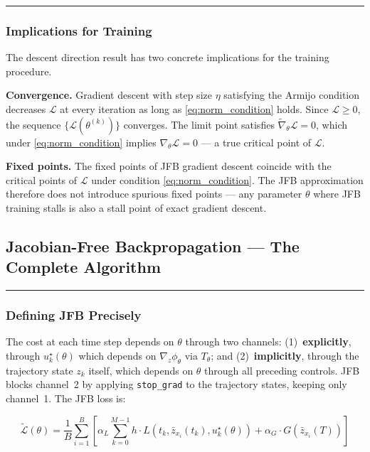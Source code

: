\documentclass{article}
\begin{document}
\medskip\hrule\medskip

\subsubsection{Implications for Training}

\begin{mathrequirementsbox}
The descent direction result has two concrete implications for the training
procedure.

\textbf{Convergence.} Gradient descent with step size $\eta$ satisfying the
Armijo condition decreases $\mathcal{L}$ at every iteration as long as
\eqref{eq:norm_condition} holds. Since $\mathcal{L} \geq 0$, the sequence
$\{\mathcal{L}(\theta^{(k)})\}$ converges. The limit point satisfies
$\widetilde{\nabla}_\theta\mathcal{L} = 0$, which under
\eqref{eq:norm_condition} implies $\nabla_\theta\mathcal{L} = 0$ --- a true
critical point of $\mathcal{L}$.

\textbf{Fixed points.} The fixed points of JFB gradient descent coincide
with the critical points of $\mathcal{L}$ under condition
\eqref{eq:norm_condition}. The JFB approximation therefore does not
introduce spurious fixed points --- any parameter $\theta$ where JFB
training stalls is also a stall point of exact gradient descent.
\end{mathrequirementsbox}


\subsection{Jacobian-Free Backpropagation --- The Complete Algorithm}
\label{sec:jfb}

\medskip\hrule\medskip

\subsubsection{Defining JFB Precisely}

The cost at each time step depends on $\theta$ through two channels:
(1)~\textbf{explicitly}, through $u^\star_k(\theta)$ which depends on
$\nabla_z\phi_\theta$ via $T_\theta$; and
(2)~\textbf{implicitly}, through the trajectory state $z_k$ itself, which
depends on $\theta$ through all preceding controls. JFB blocks channel~2 by
applying \texttt{stop\_grad} to the trajectory states, keeping only channel~1.
The JFB loss is:

\begin{equation}
    \widetilde{\mathcal{L}}(\theta)
    = \frac{1}{B}\sum_{i=1}^{B}
    \left[\alpha_L \sum_{k=0}^{M-1}
    h \cdot L(t_k, \bar{z}_{x_i}(t_k), u^\star_k(\theta))
    + \alpha_G \cdot G(\bar{z}_{x_i}(T))\right]
    \label{eq:jfb_loss}
\end{equation}
\end{document}
